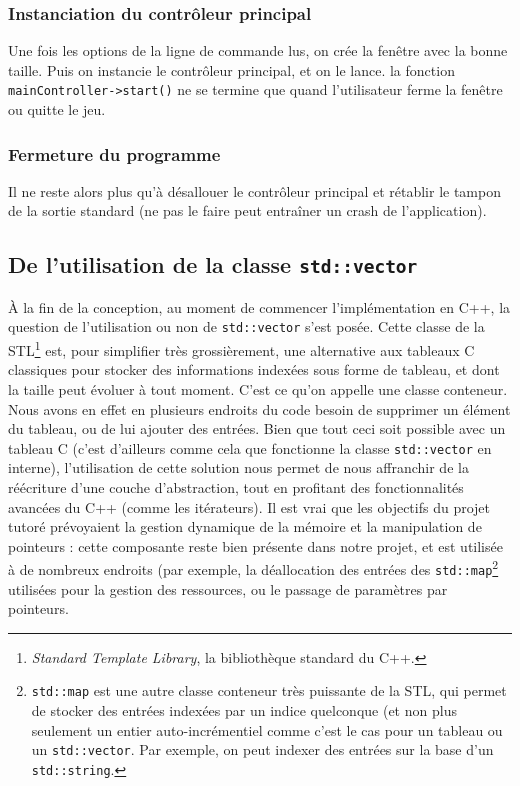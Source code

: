\documentclass[a4paper,10pt]{report}
\begin{document}
\subsubsection{Instanciation du contrôleur principal}
Une fois les options de la ligne de commande lus, on crée la fenêtre avec la bonne taille. Puis on instancie le contrôleur principal, et on le lance. la fonction \texttt{mainController->start()} ne se termine que quand l'utilisateur ferme la fenêtre ou quitte le jeu.
\subsubsection{Fermeture du programme}
Il ne reste alors plus qu'à désallouer le contrôleur principal et rétablir le tampon de la sortie standard (ne pas le faire peut entraîner un crash de l'application).
\subsection{De l'utilisation de la classe \texttt{std::vector}}
À la fin de la conception, au moment de commencer l'implémentation en C++, la question de l'utilisation ou non de \texttt{std::vector} s'est posée. Cette classe de la STL\footnote{\textit{Standard Template Library}, la bibliothèque standard du C++.} est, pour simplifier très grossièrement, une alternative aux tableaux C classiques pour stocker des informations indexées sous forme de tableau, et dont la taille peut évoluer à tout moment. C'est ce qu'on appelle une classe conteneur. Nous avons en effet en plusieurs endroits du code besoin de supprimer un élément du tableau, ou de lui ajouter des entrées. Bien que tout ceci soit possible avec un tableau C (c'est d'ailleurs comme cela que fonctionne la classe \texttt{std::vector} en interne), l'utilisation de cette solution nous permet de nous affranchir de la réécriture d'une couche d'abstraction, tout en profitant des fonctionnalités avancées du C++ (comme les itérateurs). Il est vrai que les objectifs du projet tutoré prévoyaient la gestion dynamique de la mémoire et la manipulation de pointeurs : cette composante reste bien présente dans notre projet, et est utilisée à de nombreux endroits (par exemple, la déallocation des entrées des \texttt{std::map}\footnote{\texttt{std::map} est une autre classe conteneur très puissante de la STL, qui permet de stocker des entrées indexées par un indice quelconque (et non plus seulement un entier auto-incrémentiel comme c'est le cas pour un tableau ou un \texttt{std::vector}. Par exemple, on peut indexer des entrées sur la base d'un \texttt{std::string}.} utilisées pour la gestion des ressources, ou le passage de paramètres par pointeurs. 
\end{document}
